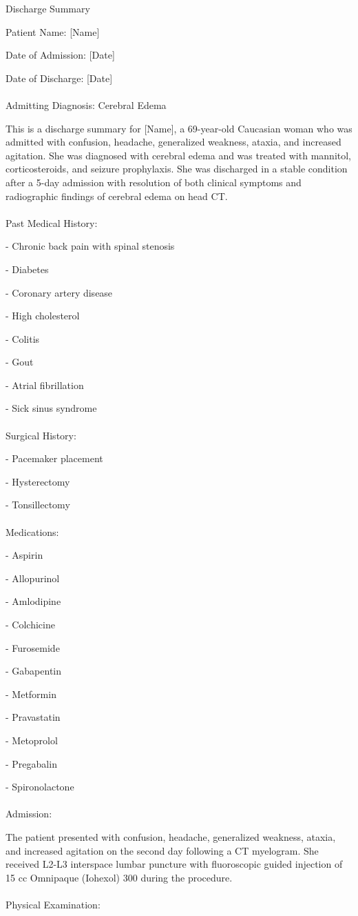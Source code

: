 Discharge Summary

Patient Name: [Name]

Date of Admission: [Date]

Date of Discharge: [Date]
\\\\Admitting Diagnosis: Cerebral Edema

This is a discharge summary for [Name], a 69-year-old Caucasian woman who was admitted with confusion, headache, generalized weakness, ataxia, and increased agitation. She was diagnosed with cerebral edema and was treated with mannitol, corticosteroids, and seizure prophylaxis. She was discharged in a stable condition after a 5-day admission with resolution of both clinical symptoms and radiographic findings of cerebral edema on head CT.
\\\\Past Medical History:

- Chronic back pain with spinal stenosis

- Diabetes

- Coronary artery disease

- High cholesterol

- Colitis

- Gout

- Atrial fibrillation

- Sick sinus syndrome
\\\\Surgical History:

- Pacemaker placement

- Hysterectomy

- Tonsillectomy
\\\\Medications:

- Aspirin

- Allopurinol

- Amlodipine

- Colchicine

- Furosemide

- Gabapentin

- Metformin

- Pravastatin

- Metoprolol

- Pregabalin

- Spironolactone
\\\\Admission:

The patient presented with confusion, headache, generalized weakness, ataxia, and increased agitation on the second day following a CT myelogram. She received L2-L3 interspace lumbar puncture with fluoroscopic guided injection of 15 cc Omnipaque (Iohexol) 300 during the procedure.
\\\\Physical Examination:

